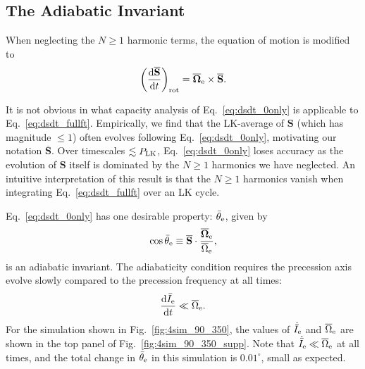 \documentclass[
        twocolumn,
        twocolappendix
    ]{aastex63}
\newcommand*{\rd}[2]{\frac{\mathrm{d}#1}{\mathrm{d}#2}}
\renewcommand*{\bm}[1]{\boldsymbol{\mathbf{#1}}}
\newcommand*{\p}[1]{\left(#1\right)}
\begin{document}
\subsection{The Adiabatic Invariant}

When neglecting the $N \geq 1$ harmonic terms, the equation of motion is
modified to
\begin{equation}
    \p{\rd{\bm{\overline{S}}}{t}}_{\rm rot}
        = \bm{\overline{\Omega}}_{\rm e}
            \times \bm{\overline{S}}.\label{eq:dsdt_0only}
\end{equation}

It is not obvious in what capacity analysis of Eq.~\eqref{eq:dsdt_0only} is
applicable to Eq.~\eqref{eq:dsdt_fullft}. Empirically, we find that the
LK-average of $\bm{S}$ (which has magnitude $\leq 1$) often evolves following
Eq.~\eqref{eq:dsdt_0only}, motivating our notation $\bm{\overline{S}}$.
Over timescales $\lesssim P_{\rm LK}$, Eq.~\eqref{eq:dsdt_0only} loses accuracy
as the evolution of $\bm{S}$ itself is dominated by the $N \geq 1$ harmonics we
have neglected. An intuitive interpretation of this result is that the $N \geq
1$ harmonics vanish when integrating Eq.~\eqref{eq:dsdt_fullft} over an LK
cycle.

Eq.~\eqref{eq:dsdt_0only} has one desirable property: $\bar{\theta}_{\rm e}$,
given by
\begin{equation}
    \cos \bar{\theta}_{\rm e} \equiv
        \bm{\overline{S}} \cdot \frac{\bm{\overline{\Omega}}_{\rm
            e}}{\overline{\Omega}_{\rm e}},
        \label{eq:q_eff}
\end{equation}
is an adiabatic invariant. The adiabaticity condition requires the precession
axis evolve slowly compared to the precession frequency at all times:
\begin{equation}
    \rd{\bar{I}_{\rm e}}{t} \ll \overline{\Omega}_{\rm e}.\label{eq:ad_constr}
\end{equation}
For the simulation shown in Fig.~\ref{fig:4sim_90_350}, the values of
$\dot{\bar{I}}_{\rm e}$ and $\overline{\Omega}_{\rm e}$ are shown in the top
panel of Fig.~\ref{fig:4sim_90_350_supp}. Note that $\dot{\bar{I}}_{\rm e} \ll
\overline{\Omega}_{\rm e}$ at all times, and the total change in
$\bar{\theta}_{\rm e}$ in this simulation is $0.01^\circ$, small as expected.

\end{document}
